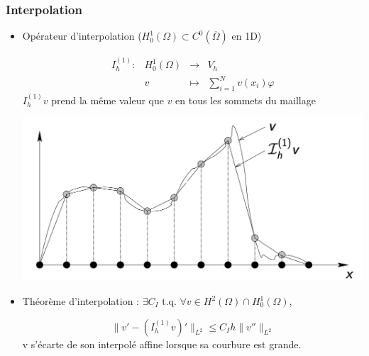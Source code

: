 \documentclass{beamer}
\begin{document}
\begin{frame}
\frametitle{Interpolation}
\begin{itemize}
\item Opérateur d'interpolation ($H^1_0(\Omega) \subset C^0(\overline{\Omega})$ en 1D)

\[\begin{array}{cccl}
I_h^{(1)}:&H^1_0(\Omega) &\to &V_h\\
& v&\mapsto &\sum_{i=1}^Nv(x_i)\varphi
\end{array}
\]
$I_h^{(1)} v$  prend la même valeur que $v$ en tous les sommets du maillage
\begin{center}
\includegraphics[scale=0.18]{interpolation00.png} 
\end{center}
\item Théorème d'interpolation : $\exists C_{I}$ t.q. $\forall v\in H^2(\Omega) \cap H^1_0(\Omega)$, 

\[\|v'-(I_h^{(1)} v)'\|_{L^2}\leq C_{I} h \|v''\|_{L^2} \]
v s'écarte de son interpolé affine lorsque sa courbure est grande.
\end{itemize}


\end{frame}
\end{document}
